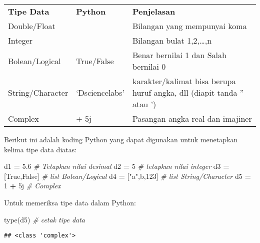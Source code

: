 \documentclass[
]{docs}
\newenvironment{Shaded}{\begin{snugshade}}{\end{snugshade}}
\newcommand{\BuiltInTok}[1]{#1}
\newcommand{\CommentTok}[1]{\textcolor[rgb]{0.56,0.35,0.01}{\textit{#1}}}
\newcommand{\DecValTok}[1]{\textcolor[rgb]{0.00,0.00,0.81}{#1}}
\newcommand{\FloatTok}[1]{\textcolor[rgb]{0.00,0.00,0.81}{#1}}
\newcommand{\NormalTok}[1]{#1}
\newcommand{\OperatorTok}[1]{\textcolor[rgb]{0.81,0.36,0.00}{\textbf{#1}}}
\newcommand{\OtherTok}[1]{\textcolor[rgb]{0.56,0.35,0.01}{#1}}
\newcommand{\StringTok}[1]{\textcolor[rgb]{0.31,0.60,0.02}{#1}}
\newcommand{\VariableTok}[1]{\textcolor[rgb]{0.00,0.00,0.00}{#1}}
\begin{document}
\begin{longtable}[]{@{}
  >{\centering\arraybackslash}p{}
  >{\centering\arraybackslash}p{}
  >{\centering\arraybackslash}p{}@{}}
\toprule()
\endhead
\textbf{Tipe Data} & \textbf{Python} & \textbf{Penjelasan} \\
Double/Float & 5.6 & Bilangan yang mempunyai koma \\
Integer & 5 & Bilangan bulat 1,2,\ldots,n \\
Bolean/Logical & True/False & Benar bernilai 1 dan Salah bernilai 0 \\
String/Character & `Dsciencelabs' & karakter/kalimat bisa berupa huruf angka, dll (diapit tanda '' atau ') \\
Complex & 1 + 5j & Pasangan angka real dan imajiner \\
\bottomrule()
\end{longtable}

Berikut ini adalah koding Python yang dapat digunakan untuk menetapkan kelima tipe data diatas:

\begin{Shaded}
\begin{Highlighting}[]
\NormalTok{d1 }\OperatorTok{=} \FloatTok{5.6}             \CommentTok{\# Tetapkan nilai desimal }
\NormalTok{d2 }\OperatorTok{=} \DecValTok{5}               \CommentTok{\# tetapkan nilai integer}
\NormalTok{d3 }\OperatorTok{=}\NormalTok{ [}\VariableTok{True}\NormalTok{,}\VariableTok{False}\NormalTok{]    }\CommentTok{\# list Bolean/Logical}
\NormalTok{d4 }\OperatorTok{=}\NormalTok{ [}\StringTok{"a"}\NormalTok{,}\StringTok{\textquotesingle{}b\textquotesingle{}}\NormalTok{,}\StringTok{\textquotesingle{}123\textquotesingle{}}\NormalTok{] }\CommentTok{\# list String/Character}
\NormalTok{d5 }\OperatorTok{=} \DecValTok{1} \OperatorTok{+} \OtherTok{5j}          \CommentTok{\# Complex }
\end{Highlighting}
\end{Shaded}

Untuk memeriksa tipe data dalam Python:

\begin{Shaded}
\begin{Highlighting}[]
\BuiltInTok{type}\NormalTok{(d5)             }\CommentTok{\# cetak tipe data}
\end{Highlighting}
\end{Shaded}

\begin{verbatim}
## <class 'complex'>
\end{verbatim}
\end{document}
